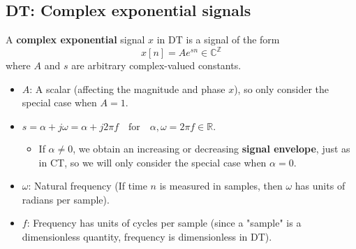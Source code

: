 \subsection{DT: Complex exponential signals}
\begin{definition}
    A \textbf{complex exponential} signal \(x\) in DT is a signal of the form
    \begin{equation}
        x[n] = A e^{sn} \in \mathbb{C}^\mathbb{Z}
    \end{equation}
    where \(A\) and \(s\) are arbitrary complex-valued constants.

    \begin{itemize}
        \item \(A\): A scalar (affecting the magnitude and phase \(x\)), so only consider the special case when \(A = 1\).
        \item $s = \alpha + j \omega = \alpha + j 2 \pi f \quad \text{for} \quad \alpha, \omega = 2 \pi f \in \mathbb{R}.$
        \begin{itemize}
            \item If \(\alpha \neq 0\), we obtain an increasing or decreasing \textbf{signal envelope}, just as in CT, so we will only consider the special case when \(\alpha = 0\).
        \end{itemize} 
        \item \(\omega\): Natural frequency (If time \(n\) is measured in samples, then \(\omega\) has units of radians per sample).
        \item \(f\): Frequency has units of cycles per sample (since a "sample" is a dimensionless quantity, frequency is dimensionless in DT).
    \end{itemize}

\end{definition}
    
